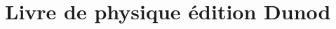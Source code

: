 \documentclass[../main.tex]{subfiles}
\begin{document}
\section{Livre de physique édition Dunod}

    
\end{document}
